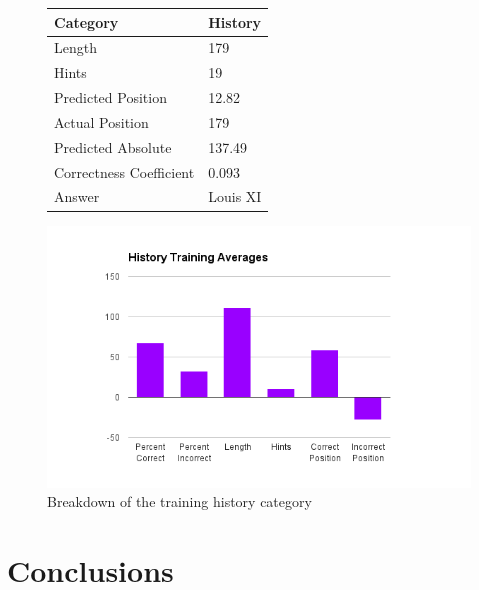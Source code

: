 \documentclass[letterpaper]{article}
\begin{document}
\begin{figure}
\centering
\begin{minipage}[t]{.4\textwidth}
\centering
\vspace{0pt}

\begin{tabular}{|l|l |}
\hline
Category & History \\ \hline
Length &  179 \\
Hints & 19 \\
Predicted Position & 12.82 \\
Actual Position & 179\\ 
Predicted Absolute & 137.49 \\ 
Correctness Coefficient & 0.093 \\
Answer & Louis XI \\ \hline

\end{tabular}
\end{minipage}\hfill
\begin{minipage}[t]{.4\textwidth}
\centering
\vspace{0pt}
\includegraphics[width=\textwidth]{history.png}
\caption{Breakdown of the training history category}
\label{fig:mircoH}
\end{minipage}
\end{figure}




\section{Conclusions}
\end{document}
